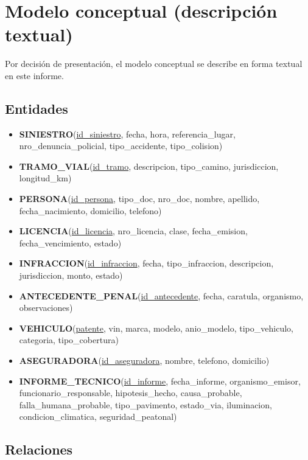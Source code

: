 \documentclass[12pt,a4paper]{article}
\begin{document}
\section{Modelo conceptual (descripción textual)}

Por decisión de presentación, el modelo conceptual se describe en forma textual en este informe.

\subsection*{Entidades}

\begin{itemize}[leftmargin=*]
    \item \textbf{SINIESTRO}(\underline{id\_siniestro}, fecha, hora, referencia\_lugar, nro\_denuncia\_policial, tipo\_accidente, tipo\_colision)
    \item \textbf{TRAMO\_VIAL}(\underline{id\_tramo}, descripcion, tipo\_camino, jurisdiccion, longitud\_km)
    \item \textbf{PERSONA}(\underline{id\_persona}, tipo\_doc, nro\_doc, nombre, apellido, fecha\_nacimiento, domicilio, telefono)
    \item \textbf{LICENCIA}(\underline{id\_licencia}, nro\_licencia, clase, fecha\_emision, fecha\_vencimiento, estado)
    \item \textbf{INFRACCION}(\underline{id\_infraccion}, fecha, tipo\_infraccion, descripcion, jurisdiccion, monto, estado)
    \item \textbf{ANTECEDENTE\_PENAL}(\underline{id\_antecedente}, fecha, caratula, organismo, observaciones)
    \item \textbf{VEHICULO}(\underline{patente}, vin, marca, modelo, anio\_modelo, tipo\_vehiculo, categoria, tipo\_cobertura)
    \item \textbf{ASEGURADORA}(\underline{id\_aseguradora}, nombre, telefono, domicilio)
    \item \textbf{INFORME\_TECNICO}(\underline{id\_informe}, fecha\_informe, organismo\_emisor, funcionario\_responsable, hipotesis\_hecho, causa\_probable, falla\_humana\_probable, tipo\_pavimento, estado\_via, iluminacion, condicion\_climatica, seguridad\_peatonal)
\end{itemize}

\subsection*{Relaciones}
\end{document}
